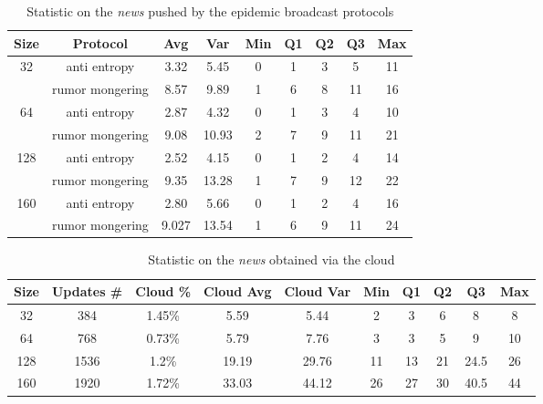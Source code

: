 \begin{table}[h!]
  \centering
  \begin{tabular}{|c|c|c|c|c|c|c|c|c|}
  \hline
  Size & Protocol & Avg & Var & Min & Q1 & Q2 & Q3 & Max\\
  \hline
  \hline

  \multirow{2}{*}{32} &
        anti entropy & 3.32 & 5.45 & 0 & 1 & 3 & 5 & 11 \\

       &rumor mongering & 8.57  & 9.89 & 1 & 6 & 8 & 11 & 16\\

  \hline
  \multirow{2}{*}{64} &
        anti entropy & 2.87 & 4.32 & 0 & 1 & 3 & 4 & 10\\

      & rumor mongering & 9.08 & 10.93 & 2 & 7 & 9 & 11 & 21\\

  \hline
  \multirow{2}{*}{128} &
        anti entropy & 2.52 & 4.15 & 0 & 1 & 2 & 4 & 14\\

      & rumor mongering & 9.35 & 13.28 & 1 & 7 & 9 & 12 & 22 \\

  \hline
  \multirow{2}{*}{160} &
        anti entropy & 2.80 & 5.66 & 0 & 1 & 2 & 4 & 16\\

      & rumor mongering & 9.027 & 13.54 & 1 & 6 & 9 & 11 & 24 \\
  \hline
  \end{tabular}
  \caption{Statistic on the \textit{news} pushed by the epidemic
    broadcast protocols}
  \label{tbl:pushed-news}
\end{table}

\begin{table}[h!]
  \hspace{-30pt}
  \begin{tabular}{|c|c|c|c|c|c|c|c|c|c|}
  \hline
  Size & Updates \# & Cloud \% & Cloud Avg & Cloud Var & Min & Q1 & Q2 & Q3 & Max\\
  \hline
  \hline
  32 & 384 & 1.45\%  & 5.59 & 5.44 & 2 & 3 & 6 & 8 & 8 \\
  64 & 768 & 0.73\% & 5.79 & 7.76 & 3 & 3 & 5 & 9 & 10 \\
  128 & 1536 & 1.2\% & 19.19 & 29.76 & 11 & 13 & 21 & 24.5 & 26\\
  160 & 1920 & 1.72\% &33.03 & 44.12 & 26 & 27 & 30 & 40.5 & 44 \\
  \hline
  \end{tabular}
  \caption{Statistic on the \textit{news} obtained via the cloud}
  \label{tbl:cloud-news}
\end{table}
